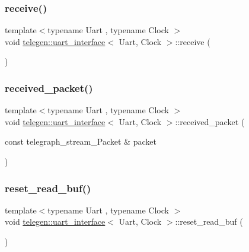 \subsubsection{\texorpdfstring{receive()}{receive()}}
{\footnotesize\ttfamily template$<$typename Uart , typename Clock $>$ \\
void \hyperlink{classtelegen_1_1uart__interface}{telegen\+::uart\+\_\+interface}$<$ Uart, Clock $>$\+::receive (\begin{DoxyParamCaption}{ }\end{DoxyParamCaption})\hspace{0.3cm}{\ttfamily [inline]}}

\mbox{\label{classtelegen_1_1uart__interface_a7b7a2f161f41a0bea021876ba459c910}} 
\subsubsection{\texorpdfstring{received\+\_\+packet()}{received\_packet()}}
{\footnotesize\ttfamily template$<$typename Uart , typename Clock $>$ \\
void \hyperlink{classtelegen_1_1uart__interface}{telegen\+::uart\+\_\+interface}$<$ Uart, Clock $>$\+::received\+\_\+packet (\begin{DoxyParamCaption}\item[{const telegraph\+\_\+stream\+\_\+\+Packet \&}]{packet }\end{DoxyParamCaption})\hspace{0.3cm}{\ttfamily [inline]}}

\mbox{\label{classtelegen_1_1uart__interface_a83061b24c65c0c50d89635af69fb1172}} 
\subsubsection{\texorpdfstring{reset\+\_\+read\+\_\+buf()}{reset\_read\_buf()}}
{\footnotesize\ttfamily template$<$typename Uart , typename Clock $>$ \\
void \hyperlink{classtelegen_1_1uart__interface}{telegen\+::uart\+\_\+interface}$<$ Uart, Clock $>$\+::reset\+\_\+read\+\_\+buf (\begin{DoxyParamCaption}{ }\end{DoxyParamCaption})\hspace{0.3cm}{\ttfamily [inline]}}

